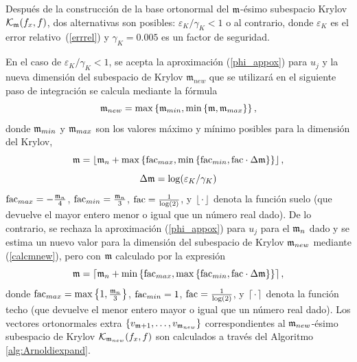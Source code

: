 Después de la construcción de la base ortonormal del $\mathfrak{m}$-ésimo subespacio Krylov $\mathcal{K}_{\mathfrak{m}}(f_x,f)$, dos alternativas son posibles: $\varepsilon_{K}/\gamma_{K}< 1$ o al contrario, donde $\varepsilon_{K}$
es el error relativo~(\ref{errrel}) y $\gamma_{K}=0.005$ es un factor de seguridad.

En el caso de $\varepsilon_{K}/\gamma_{K}< 1$, se acepta la aproximación (\ref{phi_appox}) para $u_j$ y la nueva dimensión del subespacio de Krylov $\mathfrak{m}_{new}$ que se utilizará en el siguiente paso de integración se calcula mediante la fórmula
\begin{equation}\label{calcmnew}
    \mathfrak{m}_{new}= \max\left\{ \mathfrak{m}_{min}, \min\left\{ \mathfrak{m} , \mathfrak{m}_{max}  \right\} \right\},
\end{equation}
    donde $\mathfrak{m}_{min}$ y $\mathfrak{m}_{max}$ son los valores máximo y mínimo posibles para la dimensión del Krylov,
\begin{equation*}
    \mathfrak{m} = \left\lfloor \mathfrak{m}_{n} + \max\left\{ \mathrm{fac}_{max} , \min\left\{ \mathrm{fac}_{min},
            \mathrm{fac}\cdot\Delta\mathfrak{m} \right\}  \right\} \right\rfloor,
\end{equation*}
\begin{equation}
    \Delta\mathfrak{m}=\log(\varepsilon_{K}/\gamma_{K}) \label{delta_m}
\end{equation}
$\mathrm{fac}_{max}= -\frac{\mathfrak{m}_n}{4}$, $\mathrm{fac}_{min}= \frac{\mathfrak{m}_n}{3}$, $\mathrm{fac}=\frac{1}{\log( 2)}$, y $\left\lfloor \cdot \right\rfloor$ denota la función suelo (que devuelve el mayor entero menor o igual que un número real dado). De lo contrario, se rechaza la aproximación (\ref{phi_appox}) para $u_j$ para el $\mathfrak{m}_n$ dado y se estima un nuevo valor para la dimensión del subespacio de Krylov $\mathfrak{m}_{new}$ mediante (\ref{calcmnew}), pero con $\mathfrak{m}$ calculado por la expresión
\begin{equation*}
    \mathfrak{m} = \left\lceil \mathfrak{m}_{n} + \min\left\{ \mathrm{fac}_{max} , \max\left\{ \mathrm{fac}_{min},
            \mathrm{fac}\cdot\Delta\mathfrak{m} \right\}  \right\} \right\rceil,
\end{equation*}
donde $\mathrm{fac}_{max}= \max\left\{  1,\frac{\mathfrak{m}_{n}}{3}  \right\}$, $\mathrm{fac}_{min}= 1 $, $\mathrm{fac}=\frac{1}{\log (2)}$, y $\left\lceil \cdot \right\rceil$ denota la función techo (que devuelve el menor entero mayor o igual que un número real dado). Los vectores ortonormales extra $\{v_{\mathfrak{m}+1},\ldots,v_{\mathfrak{m}_{new}} \}$ correspondientes al $\mathfrak{m}_{new}$-ésimo subespacio de Krylov $\mathcal{K}_{\mathfrak{m}_{new}}(f_x,f)$ son calculados a través del Algoritmo \ref{alg:Arnoldiexpand}.
